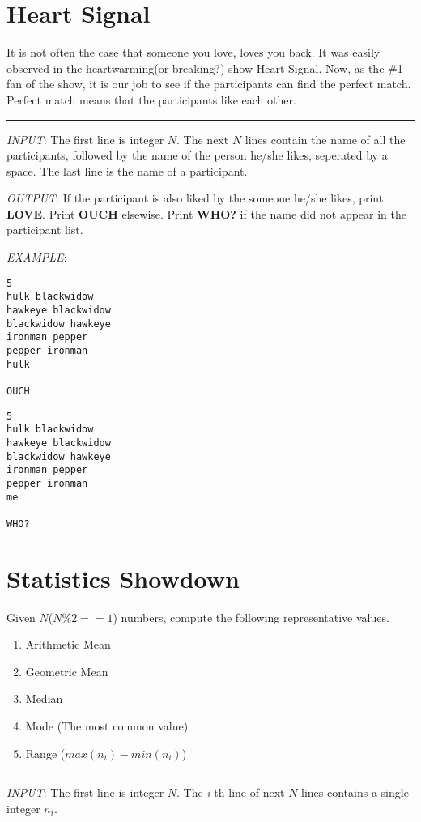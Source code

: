 \documentclass{article}
\begin{document}
\section{Heart Signal}
It is not often the case that someone you love, loves you back. It was easily
observed in the heartwarming(or breaking?) show Heart Signal. Now, as the \#1 fan
of the show, it is our job to see if the participants can find the
perfect match. Perfect match means that the participants like each other.\\
\noindent\rule{\textwidth}{0.9pt}
\textit{INPUT}: The first line is integer $N$. The next $N$ lines contain the
name of all the participants, followed by the name of the person he/she likes,
seperated by a space. The last line is the name of a participant.

\textit{OUTPUT}: If the participant is also liked by the someone he/she likes,
print \textbf{LOVE}. Print \textbf{OUCH} elsewise. Print \textbf{WHO?} if the
name did not appear in the participant list.

\textit{EXAMPLE}:
\begin{lstlisting}
5
hulk blackwidow
hawkeye blackwidow
blackwidow hawkeye
ironman pepper
pepper ironman
hulk

OUCH
\end{lstlisting}

\begin{lstlisting}
5
hulk blackwidow
hawkeye blackwidow
blackwidow hawkeye
ironman pepper
pepper ironman
me

WHO?
\end{lstlisting}

\section{Statistics Showdown}
Given $N$($N \% 2 == 1$) numbers, compute the following representative values.
\begin{enumerate}
  \item Arithmetic Mean
  \item Geometric Mean
  \item Median
  \item Mode (The most common value)
  \item Range ($max(n_i) - min(n_i)$)
\end{enumerate}

\noindent\rule{\textwidth}{0.9pt}
\textit{INPUT}: The first line is integer $N$.
The \textit{i}-th line of next $N$ lines contains a single integer $n_{i}$.
\end{document}
